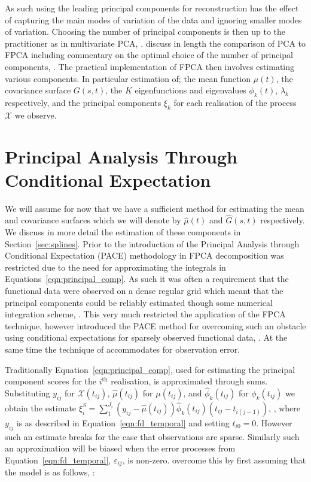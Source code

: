 As such using the leading principal components for reconstruction has the effect of capturing the main modes of variation of the data and ignoring smaller modes of variation.
Choosing the number of principal components is then up to the practitioner as in multivariate PCA, \citep{wold_principal_1987}.
 \citeauthor{ramsay_functional_2010} discuss in length the comparison of PCA to FPCA including commentary on the optimal choice of the number of principal components, \cite[Chapter~8]{ramsay_functional_2010}.
 The practical implementation of FPCA then involves estimating various components.
 In particular estimation of;  the mean function $\mu(t)$, the covariance surface $G\left(s,t \right)$, the $K$ eigenfunctions and eigenvalues $\phi_k(t)$, $\lambda_k$ respectively, and the principal components $\xi_k$ for each realisation of the process $\mathcal{X}$ we observe.

\section{Principal Analysis Through Conditional Expectation \label{sec:pace}}
We will assume for now that we have a sufficient method for estimating the mean  and covariance surfaces which we will denote by $\hat{\mu}(t)$ and $\hat{G}\left(s, t \right)$ respectively.
We discuss in more detail the estimation of these components in Section~\ref{sec:splines}.
Prior to the introduction of the Principal Analysis through Conditional Expectation (PACE) methodology in \citep{yao_functional_2005} FPCA decomposition was restricted due to the need for approximating the integrals in Equations~\eqref{eqn:principal_comp}.
As such it was often a requirement that the functional data were observed on a dense regular grid which meant that the principal components could be reliably estimated though some numerical integration scheme, \citep[Chapter~8]{ramsay_functional_2010}.
This very much restricted the application of the FPCA technique, however \citeauthor{yao_functional_2005} introduced the PACE method for overcoming such an obstacle using conditional expectations for sparsely observed functional data, \citep{yao_functional_2005}.
At the same time the technique of \citep{yao_functional_2005} accommodates for observation error. 

Traditionally Equation~\eqref{eqn:principal_comp}, used for estimating the principal component scores for the $i^\text{th}$ realisation, is approximated through sums.
Substituting $y_{ij}$ for $\mathcal{X}(t_{ij})$, $\hat{\mu}(t_{ij})$ for $\mu(t_{ij})$, and $\hat{\phi}_k(t_{ij})$ for  $\phi_k(t_{ij})$ we obtain the estimate $\xi_i^{S} = \sum_1^{J_i}\left(y_{ij} - \hat{\mu}(t_{ij})\right)\hat{\phi}_k(t_{ij})\left(t_{ij} - t_{i(j-1)}\right)$, \citep{yao_functional_2005}, where $y_{ij}$ is as described in Equation~\eqref{eqn:fd_temporal} and setting $t_{i0}=0$.
However such an estimate breaks for the case that observations are sparse. Similarly such an approximation will be biased when the error processes from Equation~\eqref{eqn:fd_temporal}, $\varepsilon_{ij}$, is non-zero.
\citeauthor{yao_functional_2005} overcome this by first assuming that the model is as follows, \citep{yao_functional_2005}:

